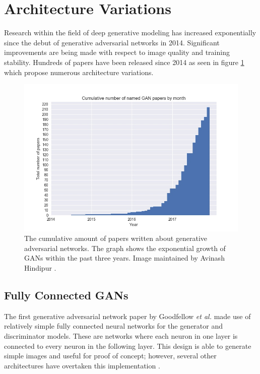 \documentclass[11pt]{article}
\begin{document}
\section{Architecture Variations}
Research within the field of deep generative modeling has increased exponentially since the debut of generative adversarial networks in 2014. Significant improvements are being made with respect to image quality and training stability. Hundreds of papers have been released since 2014 as seen in figure \ref{fig:CumulativeNumberofGANPapersbyMonth} which propose numerous architecture variations.

\begin{figure}
\centering
\includegraphics[scale=0.43]{cumulative_gans}
\caption{The cumulative amount of papers written about generative adversarial networks. The graph shows the exponential growth of GANs within the past three years. Image maintained by Avinash Hindipur \citep{November2017GANZoo}.}
\label{fig:CumulativeNumberofGANPapersbyMonth}
\end{figure}

\subsection{Fully Connected GANs}
The first generative adversarial network paper by Goodfellow \textit{et al.} made use of relatively simple fully connected neural networks for the generator and discriminator models. These are networks where each neuron in one layer is connected to every neuron in the following layer. This design is able to generate simple images and useful for proof of concept; however, several other architectures have overtaken this implementation \citep{2017arXiv171007035C}.
\end{document}
